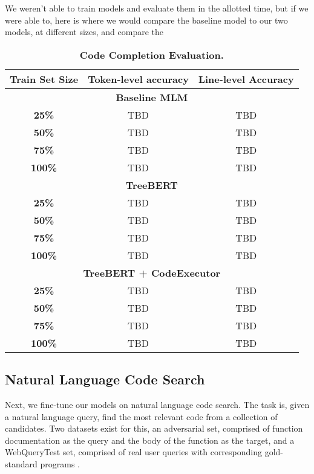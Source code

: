 \documentclass[acmlarge]{acmart}
\begin{document}
We weren't able to train models and evaluate them in the allotted time, but if we were able to, here is where we would compare the baseline model to our two models, at different sizes, and compare the 

\begin{table}[ht]
  \centering
  \begin{tabular}{|c|c|c|}
    \hline
   \textbf{Train Set Size} & \textbf{Token-level accuracy} & \textbf{Line-level Accuracy}\\
    \hline
    \multicolumn{3}{|c|}{\textbf{Baseline MLM}} \\
    \hline
    \textbf{25\%} & TBD & TBD \\
    \textbf{50\%} & TBD & TBD \\
    \textbf{75\%} & TBD & TBD \\
    \textbf{100\%} & TBD & TBD \\
    \hline
    \multicolumn{3}{|c|}{\textbf{TreeBERT}} \\
    \hline
    \textbf{25\%} & TBD & TBD \\
    \textbf{50\%} & TBD & TBD \\
    \textbf{75\%} & TBD & TBD \\
    \textbf{100\%} & TBD & TBD \\
    \hline
    \multicolumn{3}{|c|}{\textbf{TreeBERT + CodeExecutor}} \\
    \hline
    \textbf{25\%} & TBD & TBD \\
    \textbf{50\%} & TBD & TBD \\
    \textbf{75\%} & TBD & TBD \\
    \textbf{100\%} & TBD & TBD \\
    \hline
  \end{tabular}
\caption{\textbf{Code Completion Evaluation.}}
\end{table}

\subsection{Natural Language Code Search}

Next, we fine-tune our models on natural language code search. The task is, given a natural language query, find the most relevant code from a collection of candidates. Two datasets exist for this, an adversarial set, comprised of function documentation as the query and the body of the function as the target, and a WebQueryTest set, comprised of real user queries with corresponding gold-standard programs \cite{CodeXGlUE}.
\end{document}
